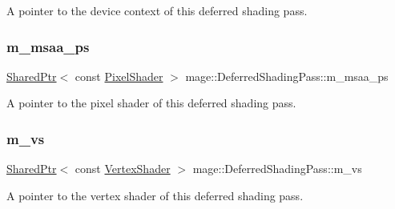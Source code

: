 A pointer to the device context of this deferred shading pass. \hypertarget{classmage_1_1_deferred_shading_pass_a2da9b0462428d209f3b546a934962a77}{}\label{classmage_1_1_deferred_shading_pass_a2da9b0462428d209f3b546a934962a77} 
\subsubsection{\texorpdfstring{m\+\_\+msaa\+\_\+ps}{m\_msaa\_ps}}
{\footnotesize\ttfamily \hyperlink{namespacemage_a1e01ae66713838a7a67d30e44c67703e}{Shared\+Ptr}$<$ const \hyperlink{namespacemage_a27ecaf266420ee7a494d64edc0757129}{Pixel\+Shader} $>$ mage\+::\+Deferred\+Shading\+Pass\+::m\+\_\+msaa\+\_\+ps\hspace{0.3cm}{\ttfamily [private]}}

A pointer to the pixel shader of this deferred shading pass. \hypertarget{classmage_1_1_deferred_shading_pass_a0bf671a656df1931dc99abc636abecd1}{}\label{classmage_1_1_deferred_shading_pass_a0bf671a656df1931dc99abc636abecd1} 
\subsubsection{\texorpdfstring{m\+\_\+vs}{m\_vs}}
{\footnotesize\ttfamily \hyperlink{namespacemage_a1e01ae66713838a7a67d30e44c67703e}{Shared\+Ptr}$<$ const \hyperlink{classmage_1_1_vertex_shader}{Vertex\+Shader} $>$ mage\+::\+Deferred\+Shading\+Pass\+::m\+\_\+vs\hspace{0.3cm}{\ttfamily [private]}}

A pointer to the vertex shader of this deferred shading pass. 